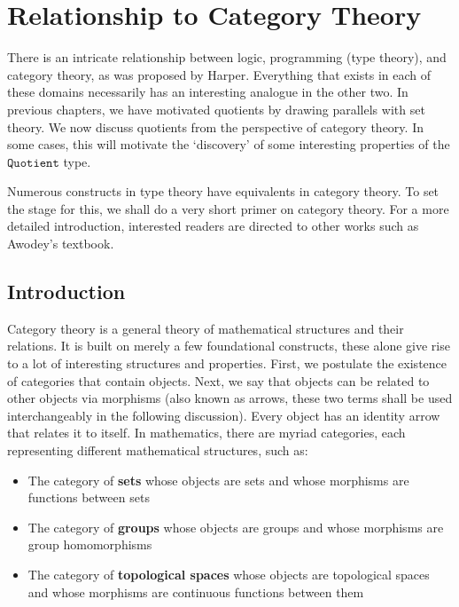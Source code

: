 \documentclass[12pt,twoside,maitrise]{dms}
\theoremstyle{definition}
\numberwithin{equation}{section}
\numberwithin{table}{chapter}
\numberwithin{figure}{chapter}
\newcommand\id[1] {\texttt{#1}}
\begin{document}
\chapter{Relationship to Category Theory}
There is an intricate relationship between logic, programming (type theory), and
category theory, as was proposed by Harper\cite{harpertrinity}. Everything that
exists in each of these domains necessarily has an interesting analogue in the
other two. In previous chapters, we have motivated quotients by drawing
parallels with set theory. We now discuss quotients from the perspective of
category theory. In some cases, this will motivate the `discovery' of some
interesting properties of the $\id{Quotient}$ type.


Numerous constructs in type theory have equivalents in category theory. To set
the stage for this, we shall do a very short primer on category theory. For a
more detailed introduction, interested readers are directed to other works such
as Awodey's textbook\cite{awodey-cattheory}.

\section{Introduction}

Category theory is a general theory of mathematical structures and their
relations. It is built on merely a few foundational constructs, these alone
give rise to a lot of interesting structures and properties. First, we
postulate the existence of categories that contain objects. Next, we say that
objects can be related to other objects via morphisms (also known as arrows,
these two terms shall be used interchangeably in the following discussion).
Every object has an identity arrow that relates it to itself. In mathematics,
there are myriad categories, each representing different mathematical
structures, such as:

\begin{itemize}
  \item{The category of \textbf{sets} whose objects are sets and whose
    morphisms are functions between sets}

  \item{The category of \textbf{groups} whose objects are groups and whose
    morphisms are group homomorphisms}

  \item{The category of \textbf{topological spaces} whose objects are
    topological spaces and whose morphisms are continuous functions between
    them}
\end{itemize}
\end{document}
